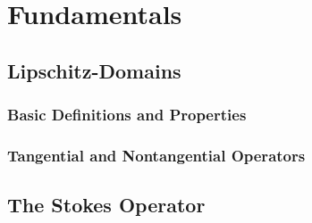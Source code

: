 \chapter{Fundamentals}

\section{Lipschitz-Domains}

\subsection{Basic Definitions and Properties}

\subsection{Tangential and Nontangential Operators}


\section{The Stokes Operator}


